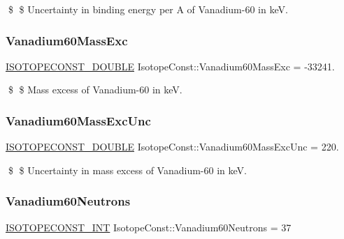 \$ \$ Uncertainty in binding energy per A of Vanadium-\/60 in keV. \mbox{\label{group___isotope_const-_vanadium-_v60_ga00c4123236ed80ec78ab6f7b09ff7c25}} 
\subsubsection{\texorpdfstring{Vanadium60\+Mass\+Exc}{Vanadium60MassExc}}
{\footnotesize\ttfamily \mbox{\hyperlink{group___isotope_const-_macros_ga8f45a7272ce02c0b4c65c44636ed719a}{I\+S\+O\+T\+O\+P\+E\+C\+O\+N\+S\+T\+\_\+\+D\+O\+U\+B\+LE}} Isotope\+Const\+::\+Vanadium60\+Mass\+Exc = -\/33241.}

\$ \$ Mass excess of Vanadium-\/60 in keV. \mbox{\label{group___isotope_const-_vanadium-_v60_ga6a0e19ae9041aeba5d335e266a1478ae}} 
\subsubsection{\texorpdfstring{Vanadium60\+Mass\+Exc\+Unc}{Vanadium60MassExcUnc}}
{\footnotesize\ttfamily \mbox{\hyperlink{group___isotope_const-_macros_ga8f45a7272ce02c0b4c65c44636ed719a}{I\+S\+O\+T\+O\+P\+E\+C\+O\+N\+S\+T\+\_\+\+D\+O\+U\+B\+LE}} Isotope\+Const\+::\+Vanadium60\+Mass\+Exc\+Unc = 220.}

\$ \$ Uncertainty in mass excess of Vanadium-\/60 in keV. \mbox{\label{group___isotope_const-_vanadium-_v60_gaf02b595494eb69b8e1926a0901223bf0}} 
\subsubsection{\texorpdfstring{Vanadium60\+Neutrons}{Vanadium60Neutrons}}
{\footnotesize\ttfamily \mbox{\hyperlink{group___isotope_const-_macros_ga5f18360b3e99483a35c32d789e62621c}{I\+S\+O\+T\+O\+P\+E\+C\+O\+N\+S\+T\+\_\+\+I\+NT}} Isotope\+Const\+::\+Vanadium60\+Neutrons = 37}

